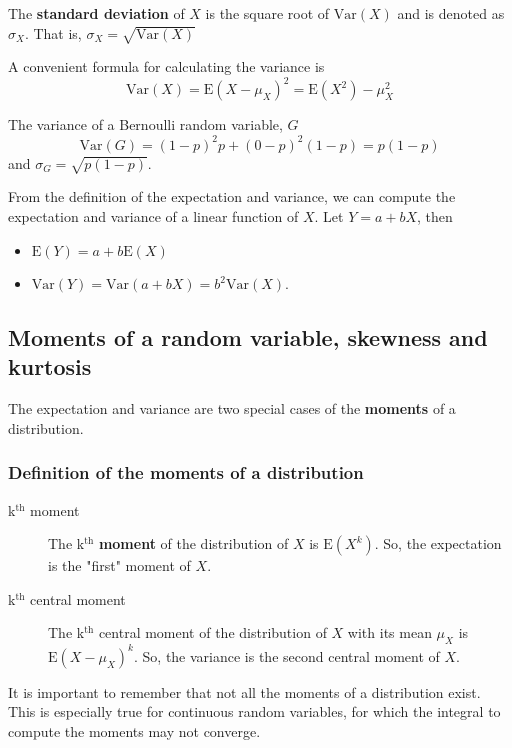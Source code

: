 \documentclass[a4paper,11pt]{article}
\begin{document}
The \textbf{standard deviation} of \(X\) is the square root of
\(\mathrm{Var}(X)\) and is denoted as \(\sigma_{X}\). That is,
\(\sigma_{X} = \sqrt{\mathrm{Var}(X)}\)

A convenient formula for calculating the variance is
\[ \mathrm{Var}(X) = \mathrm{E}(X - \mu_X)^{2} = \mathrm{E}(X^{2}) - \mu_X^{2} \]

The variance of a Bernoulli random variable, \(G\)
\[ \mathrm{Var}(G) = (1-p)^{2}p + (0-p)^{2}(1-p) = p(1-p) \] and \(\sigma_{G} =
\sqrt{p(1-p)}\).

From the definition of the expectation and variance, we can compute
the expectation and variance of a linear function of \(X\). Let \(Y = a +
bX\), then
\begin{itemize}
\item \(\mathrm{E}(Y) = a + b\mathrm{E}(X)\)
\item \(\mathrm{Var}(Y) = \mathrm{Var}(a + b X) = b^{2} \mathrm{Var}(X)\).
\end{itemize}


\subsection{Moments of a random variable, skewness and kurtosis}
\label{sec:org0553a07}

The expectation and variance are two special cases of the \textbf{moments} of
a distribution.

\subsubsection*{Definition of the moments of a distribution}
\label{sec:org13f4da9}

\begin{description}
\item[{k\(^{\text{th}}\) moment}] The k\(^{\text{th}}\) \textbf{moment} of the distribution of \(X\) is
\(\mathrm{E}(X^{k})\). So, the expectation is the "first"
moment of \(X\).

\item[{k\(^{\text{th}}\) central moment}] The k\(^{\text{th}}\) central moment of the distribution
of \(X\) with its mean \(\mu_X\) is \(\mathrm{E}(X - \mu_X)^{k}\). So, the
variance is the second central moment of \(X\).
\end{description}

It is important to remember that not all the moments of a distribution
exist. This is especially true for continuous random variables, for
which the integral to compute the moments may not converge.
\end{document}
